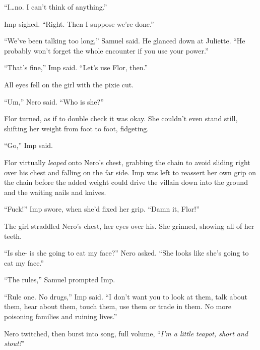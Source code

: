 ``I\ldots no.  I can't think of anything.''



Imp sighed.  ``Right.  Then I suppose we're done.''



``We've been talking too long,'' Samuel said.  He glanced down at Juliette.  ``He probably won't forget the whole encounter if you use your power.''



``That's fine,'' Imp said.  ``Let's use Flor, then.''



All eyes fell on the girl with the pixie cut.



``Um,'' Nero said.  ``Who is she?''



Flor turned, as if to double check it was okay.  She couldn't even stand still, shifting her weight from foot to foot, fidgeting.



``Go,'' Imp said.



Flor virtually \emph{leaped} onto Nero's chest, grabbing the chain to avoid sliding right over his chest and falling on the far side.  Imp was left to reassert her own grip on the chain before the added weight could drive the villain down into the ground and the waiting nails and knives.



``Fuck!''  Imp swore, when she'd fixed her grip.  ``Damn it, Flor!''



The girl straddled Nero's chest, her eyes over his.  She grinned, showing all of her teeth.



``Is she- is she going to eat my face?''  Nero asked.  ``She looks like she's going to eat my face.''



``The rules,'' Samuel prompted Imp.



``Rule one.  No drugs,''  Imp said.  ``I don't want you to look at them, talk about them, hear about them, touch them, use them or trade in them.  No more poisoning families and ruining lives.''



Nero twitched, then burst into song, full volume,  ``\emph{I'm a little teapot, short and stout!}''



